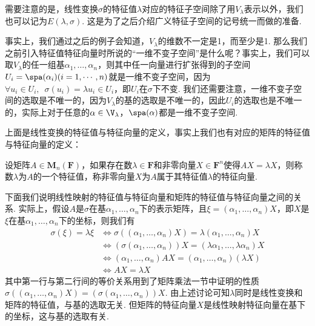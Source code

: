 需要注意的是，线性变换$\sigma$的特征值$\lambda$对应的特征子空间除了用$V_{\lambda}$表示以外，我们也可以记为$E(\lambda,\sigma)$. 这是为了之后介绍广义特征子空间的记号统一而做的准备.

事实上，我们通过之后的例子会知道，$V_\lambda$的维数不一定是1，而至少是1. 那么我们之前引入特征值特征向量时所说的``一维不变子空间''是什么呢？事实上，我们可以取$V_\lambda$的任一组基$\alpha_1,\ldots,\alpha_n$，则其中任一向量进行扩张得到的子空间$U_i=\spa(\alpha_i)(i=1,\cdots,n)$就是一维不变子空间，因为$\forall u_i\in U_i,\enspace \sigma(u_i)=\lambda u_i\in U_i$，即$U_i$在$\sigma$下不变. 我们还需要注意，一维不变子空间的选取是不唯一的，因为$V_\lambda$的基的选取是不唯一的，因此$U_i$的选取也是不唯一的，实际上对于任意的$\alpha\in\V_{\lambda}$，$\spa(\alpha)$都是一维不变子空间.

上面是线性变换的特征值与特征向量的定义，事实上我们也有对应的矩阵的特征值与特征向量的定义：
\begin{definition}
    设矩阵$A\in \mathbf{M}_n(\mathbf{F})$，如果存在数$\lambda\in\mathbf{F}$和非零向量$X\in\mathbf{F}^n$使得$AX=\lambda X$，则称数$\lambda$为$A$的一个特征值，称非零向量$X$为$A$属于其特征值$\lambda$的特征向量.
\end{definition}

下面我们说明线性映射的特征值与特征向量和矩阵的特征值与特征向量之间的关系. 实际上，假设$A$是$\sigma$在基$\alpha_1,\ldots,\alpha_n$下的表示矩阵，且$\xi=(\alpha_1,\ldots,\alpha_n)X$，即$X$是$\xi$在基$\alpha_1,\ldots,\alpha_n$下的坐标，则我们有
\begin{align*}
    \sigma(\xi)=\lambda\xi & \iff \sigma((\alpha_1,\ldots,\alpha_n)X)=\lambda(\alpha_1,\ldots,\alpha_n)X        \\
                           & \iff (\sigma(\alpha_1,\ldots,\alpha_n))X=(\lambda\alpha_1,\ldots,\lambda\alpha_n)X \\
                           & \iff (\alpha_1,\ldots,\alpha_n)AX=(\alpha_1,\ldots,\alpha_n)(\lambda X)            \\
                           & \iff AX=\lambda X
\end{align*}
其中第一行与第二行间的等价关系用到了矩阵乘法一节中证明的性质$\sigma((\alpha_1,\ldots,\alpha_n)X)=(\sigma(\alpha_1,\ldots,\alpha_n))X$. 由上述讨论可知$\lambda$同时是线性变换和矩阵的特征值，与基的选取无关. 但矩阵的特征向量$X$是线性映射特征向量在基下的坐标，这与基的选取有关.

